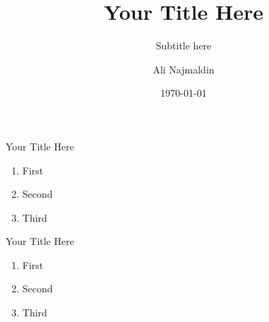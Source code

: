 \documentclass{beamer}
\title[Short Title]{Your Title Here}
\subtitle{Subtitle here}
\author{Ali Najmaldin}
\institute{McGill University}
\date{\today}
\begin{document}
\maketitle

\begin{frame}[t]{Your Title Here}\vspace{10pt}
	\begin{enumerate}
		\item First
		\item Second
		\item Third
	\end{enumerate}
\end{frame}


\begin{frame}[t]{Your Title Here}\vspace{10pt}
	\begin{enumerate}
		\item First
		\item Second
		\item Third
	\end{enumerate}
\end{frame}
\end{document}

